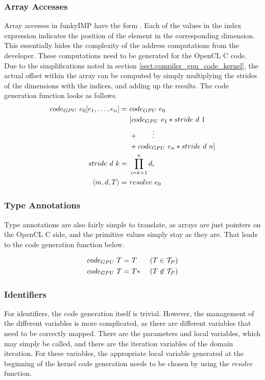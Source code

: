 \subsubsection{Array Accesses}
Array accesses in funkyIMP have the form . Each of the values in the index expression indicates the position of the element in the corresponding dimension. This essentially hides the complexity of the address computations from the developer. These computations need to be generated for the OpenCL C code. Due to the simplifications noted in section \ref{sect:compiler_gpu_code_kernel}, the actual offset within the array can be computed by simply multiplying the strides of the dimensions with the indices, and adding up the results. The code generation function looks as follows.
\begin{align}
	code_{GPU}\ e_0[e_1,\dotsc,e_n] =	&\ code_{GPU}\ e_0\\
										&\ [code_{GPU}\ e_1 * stride\ d\ 1\notag\\
										&\ + \qquad \vdots\notag\\
										&\ + code_{GPU}\ e_n * stride\ d\ n]\notag\\
	stride\ d\ k = 						&\ \prod_{i=k+1}^{n} d_i \notag	\\
	\langle m,d,T\rangle			=	&\ resolve\ e_0 \notag
\end{align}

\subsubsection{Type Annotations}
Type annotations are also fairly simple to translate, as arrays are just pointers on the OpenCL C side, and the primitive values simply stay as they are. That leads to the code generation function below.

\begin{align}
	code_{GPU}\ T = &\ T &\ (T \in \mathcal{T}_P)\\
	code_{GPU}\ T = &\ T* &\ (T \not\in \mathcal{T}_P)\notag
\end{align}

\subsubsection{Identifiers}
For identifiers, the code generation itself is trivial. However, the management of the different variables is more complicated, as there are different variables that need to be correctly mapped. There are the parameters and local variables, which may simply be called, and there are the iteration variables of the domain iteration. For these variables, the appropriate local variable generated at the beginning of the kernel code generation needs to be chosen by using the \textit{resolve} function.

